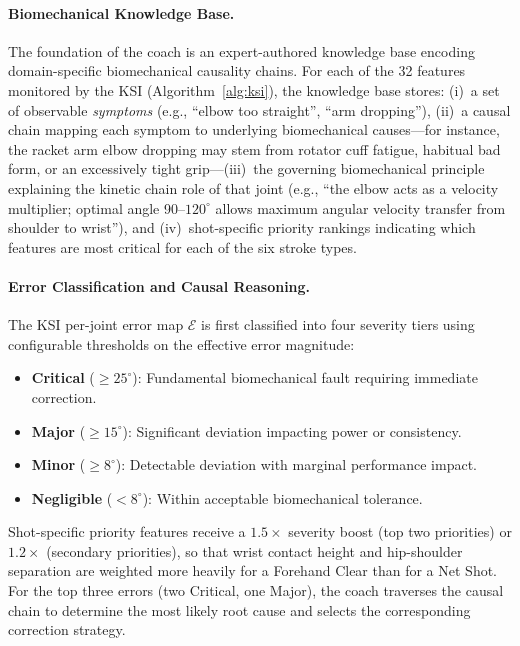 \documentclass[pdflatex,sn-mathphys-num]{sn-jnl}%
\theoremstyle{thmstyleone}%
\theoremstyle{thmstyletwo}%
\theoremstyle{thmstylethree}%
\begin{document}
\paragraph{Biomechanical Knowledge Base.}
The foundation of the coach is an expert-authored knowledge base encoding domain-specific biomechanical causality chains. For each of the 32 features monitored by the KSI (Algorithm~\ref{alg:ksi}), the knowledge base stores: (i)~a set of observable \textit{symptoms} (e.g., ``elbow too straight'', ``arm dropping''), (ii)~a causal chain mapping each symptom to underlying biomechanical causes---for instance, the racket arm elbow dropping may stem from rotator cuff fatigue, habitual bad form, or an excessively tight grip---(iii)~the governing biomechanical principle explaining the kinetic chain role of that joint (e.g., ``the elbow acts as a velocity multiplier; optimal angle 90--$120^{\circ}$ allows maximum angular velocity transfer from shoulder to wrist''), and (iv)~shot-specific priority rankings indicating which features are most critical for each of the six stroke types.

\paragraph{Error Classification and Causal Reasoning.}
The KSI per-joint error map $\mathcal{E}$ is first classified into four severity tiers using configurable thresholds on the effective error magnitude:
\begin{itemize}
    \item \textbf{Critical} ($\geq 25^{\circ}$): Fundamental biomechanical fault requiring immediate correction.
    \item \textbf{Major} ($\geq 15^{\circ}$): Significant deviation impacting power or consistency.
    \item \textbf{Minor} ($\geq 8^{\circ}$): Detectable deviation with marginal performance impact.
    \item \textbf{Negligible} ($< 8^{\circ}$): Within acceptable biomechanical tolerance.
\end{itemize}
Shot-specific priority features receive a $1.5\times$ severity boost (top two priorities) or $1.2\times$ (secondary priorities), so that wrist contact height and hip-shoulder separation are weighted more heavily for a Forehand Clear than for a Net Shot. For the top three errors (two Critical, one Major), the coach traverses the causal chain to determine the most likely root cause and selects the corresponding correction strategy.
\end{document}
